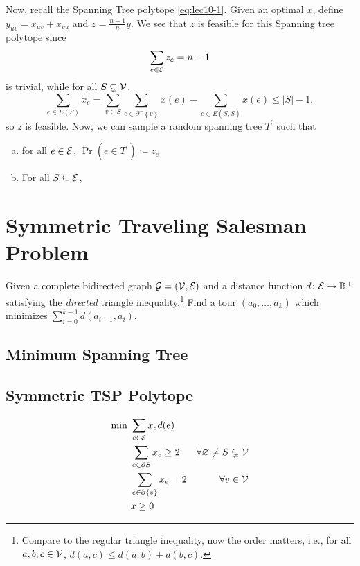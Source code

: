 Now, recall the Spanning Tree polytope \autoref{eq:lec10-1}. Given an optimal \(x\), define \(y_{uv} = x_{uv} + x_{vu}\) and \(z = \frac{n-1}{n}y\). We see that \(z\) is feasible for this Spanning tree polytope since
\[
	\sum_{e\in \mathcal{\MakeUppercase{e}} } z_e = n-1
\]
is trivial, while for all \(S \subsetneq \mathcal{\MakeUppercase{v}} \),
\[
	\sum_{e\in E(S)} x_e = \sum_{v\in S} \sum_{e\in \partial ^+ \left\{ v \right\} } x(e) - \sum_{e\in E(S, \overline{S} )} x(e) \leq \left\vert S \right\vert - 1,
\]
so \(z\) is feasible. Now, we can sample a random spanning tree \(T^\prime \) such that
\begin{enumerate}[(a)]
	\item for all \(e\in \mathcal{\MakeUppercase{e}} \), \(\Pr(e\in T^\prime ) \coloneqq z_e\)
	\item For all \(S \subseteq \mathcal{\MakeUppercase{e}} \),
\end{enumerate}



\section{Symmetric Traveling Salesman Problem}

\begin{problem}\label{prb:TSP}
Given a complete bidirected graph \(\mathcal{\MakeUppercase{g}} =(\mathcal{\MakeUppercase{v}} , \mathcal{\MakeUppercase{e}} )\) and a distance function \(d\colon \mathcal{\MakeUppercase{e}} \to \mathbb{\MakeUppercase{r}} ^+\) satisfying the \emph{directed} triangle inequality.\footnote{Compare to the regular triangle inequality, now the order matters, i.e., for all \(a, b, c\in \mathcal{\MakeUppercase{v}} \), \(d(a, c) \leq d(a, b) + d(b, c)\).} Find a \hyperref[def:tour]{tour} \((a_0, \ldots , a_k)\) which minimizes \(\sum_{i=0} ^{k-1}d(a_{i-1}, a_i)\).
\end{problem}

\subsection{Minimum Spanning Tree}



\subsection{Symmetric TSP Polytope}
\begin{align*}
	\min~ & \sum_{e\in \mathcal{\MakeUppercase{e}} } x_e d(e)                                                                     \\
	      & \sum_{e\in \partial S} x_e \geq 2                 & \forall \varnothing \neq S \subsetneq \mathcal{\MakeUppercase{v}} \\
	      & \sum_{e\in \partial \{v\}} x_e = 2                & \forall v\in \mathcal{\MakeUppercase{v}}                          \\
	      & x \geq 0
\end{align*}

